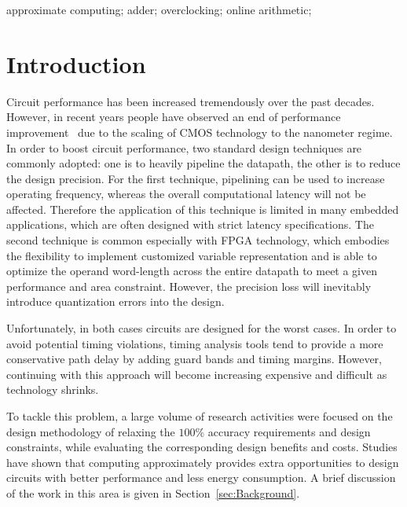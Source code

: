 \documentclass[10pt, conference, compsocconf]{IEEEtran}
\begin{document}
\begin{IEEEkeywords}
approximate computing; adder; overclocking; online arithmetic;

\end{IEEEkeywords}


\section{Introduction}
Circuit performance has been increased tremendously over the past decades. However, in recent years people have observed an end of performance improvement~\cite{DarkSilicon2011} due to the scaling of CMOS technology to the nanometer regime. In order to boost circuit performance, two standard design techniques are commonly adopted: one is to heavily pipeline the datapath, the other is to reduce the design precision. For the first technique, pipelining can be used to increase operating frequency, whereas the overall computational latency will not be affected. Therefore the application of this technique is limited in many embedded applications, which are often designed with strict latency specifications. The second technique is common especially with FPGA technology, which embodies the flexibility to implement customized variable representation and is able to optimize the operand word-length across the entire datapath to meet a given performance and area constraint. However, the precision loss will inevitably introduce quantization errors into the design.

Unfortunately, in both cases circuits are designed for the worst cases. In order to avoid potential timing violations, timing analysis tools tend to provide a more conservative path delay by adding guard bands and timing margins. However, continuing with this approach will become increasing expensive and difficult as technology shrinks.

To tackle this problem, a large volume of research activities were focused on the design methodology of relaxing the $100\%$ accuracy requirements and design constraints, while evaluating the corresponding design benefits and costs. Studies have shown that computing approximately provides extra opportunities to design circuits with better performance and less energy consumption. A brief discussion of the work in this area is given in Section~\ref{sec:Background}.
\end{document}
